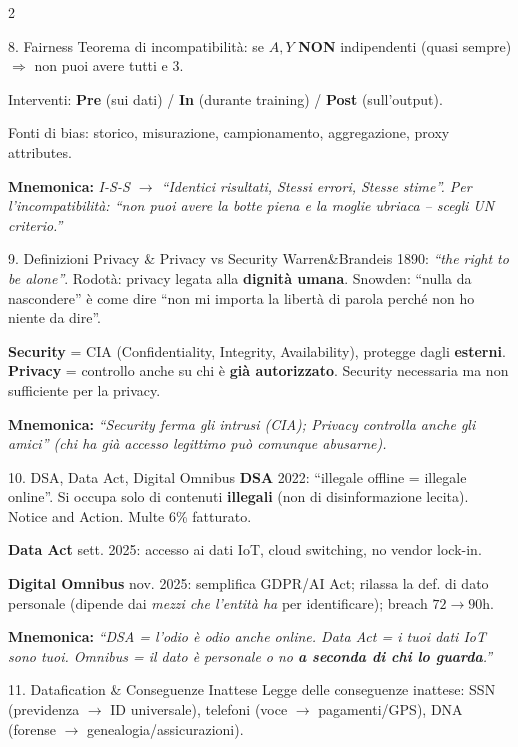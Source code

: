 \documentclass[a4paper,10pt]{article}
\newcommand{\mnem}[1]{{\color{orange!70!black}\textbf{Mnemonica:} \textit{#1}}}
\begin{document}
\begin{multicols}{2}
\begin{area}{8. Fairness}
Teorema di incompatibilit\`{a}: se $A,Y$ \textbf{NON} indipendenti (quasi sempre) $\Rightarrow$ non puoi avere tutti e 3.

Interventi: \textbf{Pre} (sui dati) / \textbf{In} (durante training) / \textbf{Post} (sull'output).

Fonti di bias: storico, misurazione, campionamento, aggregazione, proxy attributes.

\mnem{I-S-S $\to$ \emph{``Identici risultati, Stessi errori, Stesse stime''}. Per l'incompatibilit\`{a}: \emph{``non puoi avere la botte piena e la moglie ubriaca -- scegli UN criterio.''}}
\end{area}

\begin{area}{9. Definizioni Privacy \& Privacy vs Security}
Warren\&Brandeis 1890: \emph{``the right to be alone''}. Rodot\`{a}: privacy legata alla \textbf{dignit\`{a} umana}. Snowden: ``nulla da nascondere'' \`{e} come dire ``non mi importa la libert\`{a} di parola perch\'{e} non ho niente da dire''.

\textbf{Security} = CIA (Confidentiality, Integrity, Availability), protegge dagli \textbf{esterni}. \textbf{Privacy} = controllo anche su chi \`{e} \textbf{gi\`{a} autorizzato}. Security necessaria ma non sufficiente per la privacy.

\mnem{``Security ferma gli intrusi (CIA); Privacy controlla anche gli amici'' (chi ha gi\`{a} accesso legittimo pu\`{o} comunque abusarne).}
\end{area}

\begin{area}{10. DSA, Data Act, Digital Omnibus}
\textbf{DSA} 2022: ``illegale offline = illegale online''. Si occupa solo di contenuti \textbf{illegali} (non di disinformazione lecita). Notice and Action. Multe 6\% fatturato.

\textbf{Data Act} sett. 2025: accesso ai dati IoT, cloud switching, no vendor lock-in.

\textbf{Digital Omnibus} nov. 2025: semplifica GDPR/AI Act; rilassa la def. di dato personale (dipende dai \emph{mezzi che l'entit\`{a} ha} per identificare); breach $72\to90$h.

\mnem{``DSA = l'odio \`{e} odio anche online. Data Act = i tuoi dati IoT sono tuoi. Omnibus = il dato \`{e} personale o no \textbf{a seconda di chi lo guarda}.''}
\end{area}

\begin{area}{11. Datafication \& Conseguenze Inattese}
Legge delle conseguenze inattese: SSN (previdenza $\to$ ID universale), telefoni (voce $\to$ pagamenti/GPS), DNA (forense $\to$ genealogia/assicurazioni).


\end{area}
\end{multicols}
\end{document}

